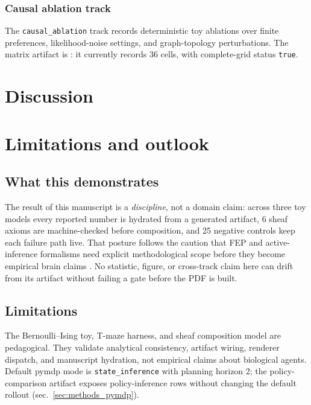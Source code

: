 \documentclass[
  english,
]{article}
\begin{document}
\subsubsection{Causal ablation track}\label{causal-ablation-track}

The \texttt{causal\_ablation} track records deterministic toy ablations
over finite preferences, likelihood-noise settings, and graph-topology
perturbations. The matrix artifact is
: it currently records
36 cells, with complete-grid status \texttt{true}.

\newpage

{}
\section*{Discussion}

\section{Limitations and outlook}\label{sec:discussion_outlook}

\subsection{What this demonstrates}\label{what-this-demonstrates}

The result of this manuscript is a \emph{discipline}, not a domain
claim: across three toy models every reported number is hydrated from a
generated artifact, 6 sheaf axioms are machine-checked before
composition, and 25 negative controls keep each failure path live. That
posture follows the caution that FEP and active-inference formalisms
need explicit methodological scope before they become empirical brain
claims \citep{gershman2019fepbrain}. No statistic, figure, or
cross-track claim here can drift from its artifact without failing a
gate before the PDF is built.

\subsection{Limitations}\label{limitations}

The Bernoulli--Ising toy, T-maze harness, and sheaf composition model
are pedagogical. They validate analytical consistency, artifact wiring,
renderer dispatch, and manuscript hydration, not empirical claims about
biological agents. Default pymdp mode is \texttt{state\_inference} with
planning horizon 2; the policy-comparison artifact exposes
policy-inference rows without changing the default rollout
(sec.~\ref{sec:methods_pymdp}).
\end{document}
